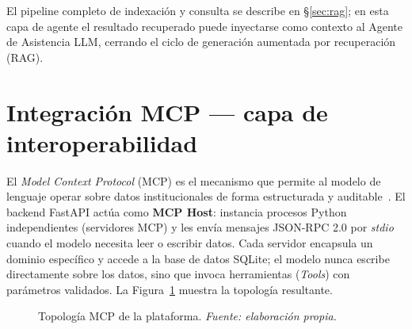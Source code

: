 El pipeline completo de indexación y consulta se describe en
§\ref{sec:rag}; en esta capa de agente el resultado recuperado puede
inyectarse como contexto al Agente de Asistencia LLM, cerrando el ciclo
de generación aumentada por recuperación (RAG).

\section{Integración MCP — capa de interoperabilidad}
\label{sec:mcp_implementacion}

El \emph{Model Context Protocol} (MCP) es el mecanismo que permite
al modelo de lenguaje operar sobre datos institucionales de forma estructurada
y auditable~\cite{hou2025model}.
El backend FastAPI actúa como \textbf{MCP Host}: instancia procesos Python
independientes (servidores MCP) y les envía mensajes JSON-RPC 2.0 por
\emph{stdio} cuando el modelo necesita leer o escribir datos.
Cada servidor encapsula un dominio específico y accede a la base de datos
SQLite; el modelo nunca escribe directamente sobre los datos, sino que invoca
herramientas (\emph{Tools}) con parámetros validados.
La Figura~\ref{fig:mcp_topologia} muestra la topología resultante.

\shorthandoff{<>}
\begin{figure}[H]
\centering
{}
\caption{Topología MCP de la plataforma. \textit{Fuente: elaboración propia.}}
\label{fig:mcp_topologia}
\end{figure}
\shorthandon{<>}

